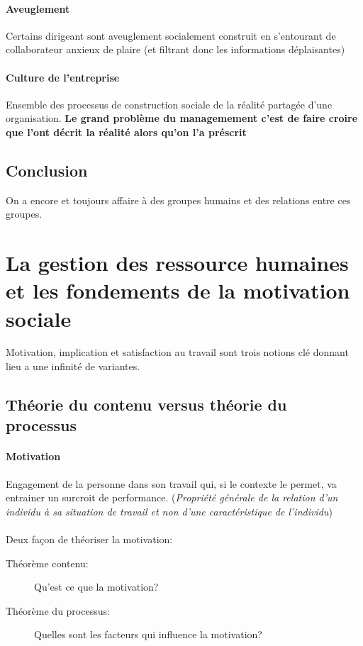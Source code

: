\documentclass[11pt]{article} %
\begin{document}
\paragraph{Aveuglement}
Certains dirigeant sont aveuglement socialement construit en s'entourant
de collaborateur anxieux de plaire (et filtrant donc les informations
déplaisantes)

\paragraph{Culture de l'entreprise} Ensemble des processus de
construction sociale de la réalité partagée d'une organisation.
\textbf{Le grand problème du managemement c'est de faire croire que
l'ont décrit la réalité alors qu'on l'a préscrit}


\subsection{Conclusion}
On a encore et toujours affaire à des groupes humains et des relations
entre ces groupes.


\section{La gestion des ressource humaines et les fondements de la motivation sociale}

Motivation, implication et satisfaction au travail sont trois notions
clé donnant lieu a une infinité de variantes.

\subsection{Théorie du contenu versus théorie du processus}

\paragraph{Motivation} Engagement de la personne dans son travail qui,
si le contexte le permet, va entrainer un surcroit de performance.
(\textit{Propriété générale de la relation d'un individu à sa situation
de travail et non d'une caractéristique de l'individu})

\paragraph{ }
Deux façon de théoriser la motivation:
\begin{description}
 \item[Théorème contenu: ] Qu'est ce que la motivation?
 \item[Théorème du processus: ] Quelles sont les facteurs qui
influence la motivation?
\end{description}
\end{document}
